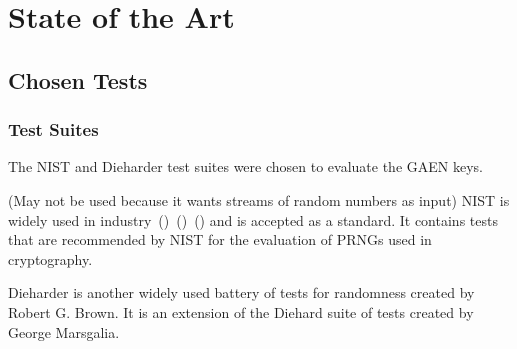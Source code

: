 \chapter{State of the Art}
\section{Chosen Tests}

\subsection{Test Suites}

The NIST and Dieharder test suites were chosen to evaluate the GAEN keys. 

(May not be used because it wants streams of random numbers as input) NIST is widely used in industry~(\cite{9209663})~(\cite{9232553})~(\cite{6236554}) and is accepted as a standard. It contains tests that are recommended by NIST for the evaluation of PRNGs used in cryptography. \par

Dieharder is another widely used battery of tests for randomness created by Robert G. Brown. It is an extension of the Diehard suite of tests created by George Marsgalia.

